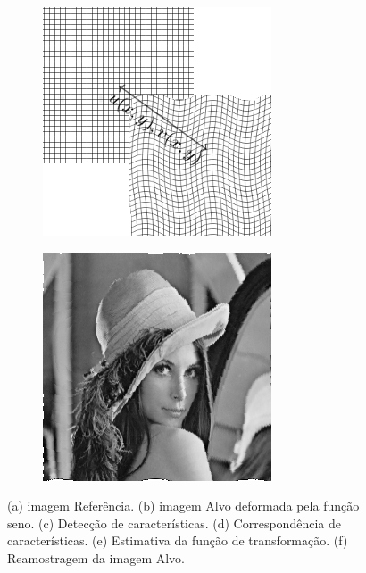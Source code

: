 \begin{figure}[h]
\begin{subfigure}[t]{0.3\textwidth}
      \includegraphics[width=\textwidth]{figuras/estimativa.png}
      \label{fig:dist-image}
    \end{subfigure} 
    \begin{subfigure}[t]{0.3\textwidth}
      \includegraphics[width=\textwidth]{figuras/leiaRegistrada.png}
      \label{fig:dist-image}
    \end{subfigure}
    \caption{(a) imagem Referência. (b) imagem Alvo deformada pela função seno. 
             (c) Detecção de características. (d) Correspondência de características.
             (e) Estimativa da função de transformação. (f) Reamostragem da imagem Alvo.}
    \label{fig:regExplicacao}
\end{figure}

